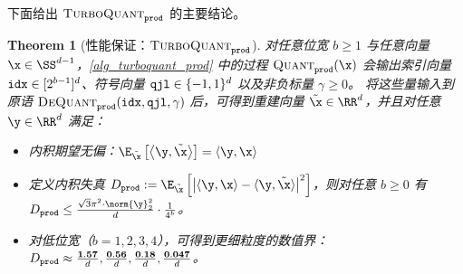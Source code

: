 \documentclass[11pt]{ctexart}
\newtheorem{theorem}{Theorem}
\newcommand{\TurboQuant}{\textsc{TurboQuant}\xspace}
\let\cref\ref
\begin{document}
下面给出 $\TurboQuant_{\tt prod}$ 的主要结论。
\begin{theorem}[性能保证：$\TurboQuant_{\tt prod}$] \label{thrm_prod}
对任意位宽 $b \ge 1$ 与任意向量 $\x \in \SS^{d-1}$，\cref{alg_turboquant_prod} 中的过程 $\textsc{Quant}_{\tt prod}(\x)$ 会输出索引向量 ${\tt idx} \in [2^{b-1}]^d$、符号向量 ${\tt qjl} \in \{ -1, 1 \}^d$ 以及非负标量 $\gamma \ge 0$。
将这些量输入到原语 $\textsc{DeQuant}_{\tt prod}({\tt idx}, {\tt qjl}, \gamma)$ 后，可得到重建向量 $\tilde{\x} \in \RR^d$，并且对任意 $\y \in \RR^d$ 满足：
\begin{itemize}
    \item 内积期望无偏：$\E_{\tilde{\x}}\left[ \left< \y, \tilde{\x} \right> \right] = \langle \y, \x \rangle$
    \item 定义内积失真 $D_{\tt prod} := \E_{\tilde{\x}}\left[\left| \langle \y, \x \rangle - \langle \y, \tilde{\x} \rangle \right|^2 \right]$，则对任意 $b \ge 0$ 有
    $D_{\tt prod} \le \frac{\sqrt{3} \pi^2 \cdot \norm{\y}_2^2}{d} \cdot \frac{1}{4^{b}}$。
    \item 对低位宽（$b = 1, 2, 3, 4$），可得到更细粒度的数值界：
    $D_{\tt prod} \approx \frac{\bf 1.57}{d}, \frac{\bf 0.56}{d}, \frac{\bf 0.18}{d}, \frac{\bf 0.047}{d}$。
\end{itemize}
\end{theorem}
\end{document}
